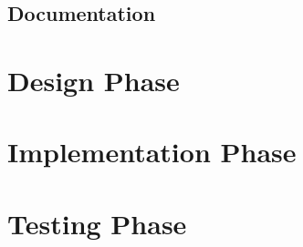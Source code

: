\subsection{Documentation}

\section{Design Phase}
\section{Implementation Phase}
\section{Testing Phase}